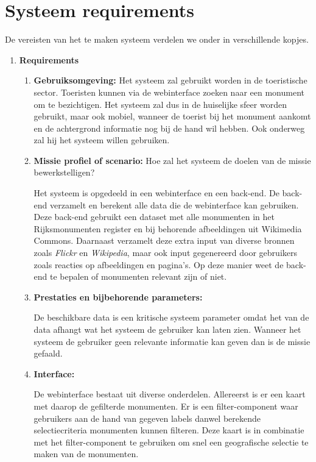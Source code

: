 \documentclass{article}
\begin{document}
\section{Systeem requirements}
De vereisten van het te maken systeem verdelen we onder in verschillende kopjes.
\begin{enumerate}
	
	\item{\textbf{Requirements}}
	\begin{enumerate}
		\item{\textbf{Gebruiksomgeving:}}		
		Het systeem zal gebruikt worden in de toeristische sector. Toeristen kunnen via de webinterface zoeken naar een monument om te bezichtigen. Het systeem zal dus in de huiselijke sfeer worden gebruikt, maar ook mobiel, wanneer de toerist bij het monument aankomt en de achtergrond informatie nog bij de hand wil hebben. Ook onderweg zal hij het systeem willen gebruiken.
		\item{\textbf{Missie profiel of scenario:}} Hoe zal het systeem de doelen van de missie bewerkstelligen? 
		
		Het systeem is opgedeeld in een webinterface en een back-end. De back-end verzamelt en berekent alle data die de webinterface kan gebruiken. Deze back-end gebruikt een dataset met alle monumenten in het Rijksmonumenten register en bij behorende afbeeldingen uit Wikimedia Commons. Daarnaast verzamelt deze extra input van diverse bronnen zoals \emph{Flickr} en \emph{Wikipedia}, maar ook input gegenereerd door gebruikers zoals reacties op afbeeldingen en pagina's. Op deze manier weet de back-end te bepalen of monumenten relevant zijn of niet. 
		
		\item{\textbf{Prestaties en bijbehorende parameters:}}
		
		De beschikbare data is een kritische systeem parameter omdat het van de data afhangt wat het systeem de gebruiker kan laten zien. Wanneer het systeem de gebruiker geen relevante informatie kan geven dan is de missie gefaald.
		
		\item{\textbf{Interface:}}
		
		De webinterface bestaat uit diverse onderdelen. Allereerst is er een kaart met daarop de gefilterde monumenten. Er is een filter-component waar gebruikers aan de hand van gegeven labels danwel berekende selectiecriteria monumenten kunnen filteren. Deze kaart is in combinatie met het filter-component te gebruiken om snel een geografische selectie te maken van de monumenten. 
		

\end{enumerate}
\end{enumerate}
\end{document}
